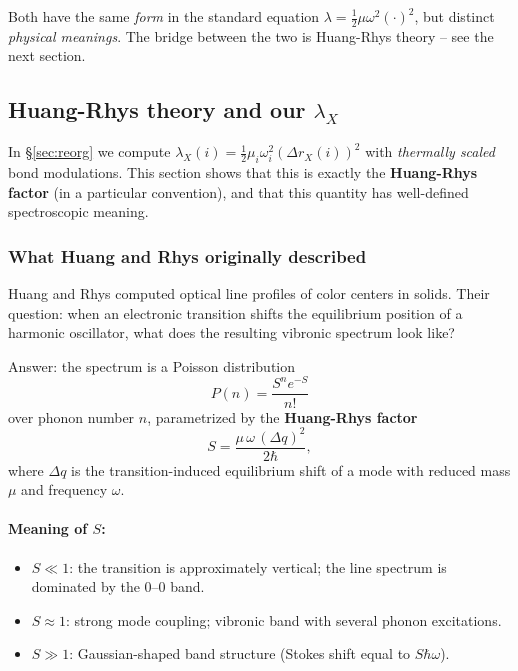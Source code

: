\documentclass[11pt,a4paper,twoside]{article}
\theoremstyle{remark}
\begin{document}
Both have the same \emph{form} in the standard equation
$\lambda = \tfrac{1}{2}\mu\omega^2(\cdot)^2$, but distinct
\emph{physical meanings}. The bridge between the two is
Huang-Rhys theory -- see the next section.

\subsection{Huang-Rhys theory and our $\lambda_X$}
\label{sec:huang-rhys}

In \S\ref{sec:reorg} we compute
$\lambda_X(i) = \tfrac{1}{2}\mu_i\omega_i^2(\Delta r_X(i))^2$ with
\emph{thermally scaled} bond modulations. This section shows that
this is exactly the \textbf{Huang-Rhys factor} (in a particular
convention), and that this quantity has well-defined spectroscopic
meaning.

\subsubsection*{What Huang and Rhys originally described}

Huang and Rhys \cite{HuangRhys1950} computed optical line profiles
of color centers in solids. Their question: when an electronic
transition shifts the equilibrium position of a harmonic
oscillator, what does the resulting vibronic spectrum look like?

Answer: the spectrum is a Poisson distribution
\begin{equation}
  P(n) = \frac{S^n e^{-S}}{n!}
\end{equation}
over phonon number $n$, parametrized by the \textbf{Huang-Rhys
factor}
\begin{equation}
  S = \frac{\mu\,\omega\,(\Delta q)^2}{2\hbar},
  \label{eq:huang-rhys}
\end{equation}
where $\Delta q$ is the transition-induced equilibrium shift of a
mode with reduced mass $\mu$ and frequency $\omega$.

\paragraph{Meaning of $S$:}
\begin{itemize}\setlength{\itemsep}{0pt}
  \item $S \ll 1$: the transition is approximately vertical;
        the line spectrum is dominated by the 0--0 band.
  \item $S \approx 1$: strong mode coupling; vibronic band with
        several phonon excitations.
  \item $S \gg 1$: Gaussian-shaped band structure (Stokes shift
        equal to $S\hbar\omega$).
\end{itemize}
\end{document}
